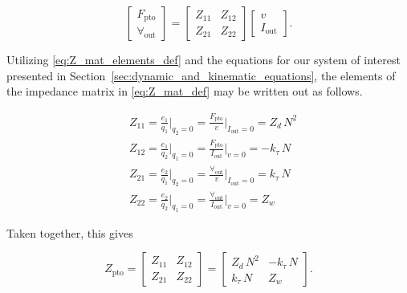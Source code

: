\documentclass[lettersize,journal]{IEEEtran}
\begin{document}
\begin{equation}
        \label{eq:Z_mat_def}
        \begin{bmatrix} 
                F_{\textrm{pto}} \\
                \forall_{\textrm{out}} 
        \end{bmatrix} 
        = 
        \begin{bmatrix} 
                Z_{11} & Z_{12} \\ 
                Z_{21} & Z_{22} 
        \end{bmatrix} 
        \begin{bmatrix} 
                v \\
                I_{\textrm{out}} 
        \end{bmatrix} .
\end{equation}

Utilizing \eqref{eq:Z_mat_elements_def} and the equations for our system of interest presented in Section~\ref{sec:dynamic_and_kinematic_equations}, the elements of the impedance matrix in \eqref{eq:Z_mat_def} may be written out as follows.

\clearpage

\begin{subequations}
        \begin{align}
                &Z_{11} = \frac{e_1}{q_1} \bigg \vert_{q_2=0} 
                = \frac{F_{\textrm{pto}}}{v} \bigg \vert_{I_{\textrm{out}}=0} = Z_d \, N^2 \\[0.5em]
                &Z_{12} = \frac{e_1}{q_2} \bigg \vert_{q_1=0} 
                = \frac{F_{\textrm{pto}}}{I_{\textrm{out}}} \bigg \vert_{v=0} = -k_\tau \, N \\[0.5em]
                &Z_{21} = \frac{e_2}{q_1} \bigg \vert_{q_2=0} 
                = \frac{\forall_{\textrm{out}}}{v} \bigg \vert_{I_{\textrm{out}}=0} = k_\tau \, N \\[0.5em]
                &Z_{22} = \frac{e_2}{q_2} \bigg \vert_{q_1=0} 
                = \frac{\forall_{\textrm{out}}}{I_{\textrm{out}}} \bigg \vert_{v=0} = Z_w 
        \end{align}
\end{subequations}

\noindent{}Taken together, this gives 

 \begin{equation}
        Z_{\textrm{pto}} 
        = 
        \begin{bmatrix} 
                Z_{11} & Z_{12} \\ 
                Z_{21} & Z_{22} 
        \end{bmatrix}
        =
        \begin{bmatrix} 
        Z_d \, N^2                              & -k_\tau \, N  \\
        k_\tau \, N          & Z_w
        \end{bmatrix}.
        \label{eq:pto_impedance}
 \end{equation}
\end{document}
